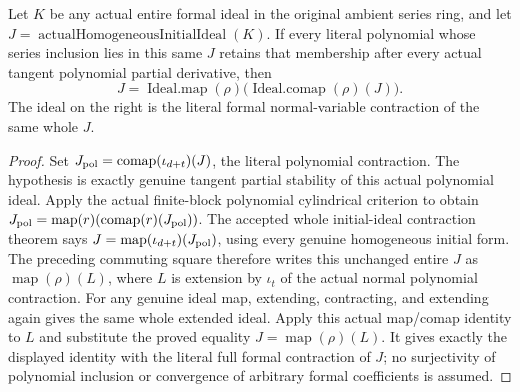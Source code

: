 \begin{theorem}
\label{hir:actual-whole-initial-normal-extension-of-polynomial-tangent-stability}
\leanok
Let $K$ be any actual entire formal ideal in the original ambient
series ring, and let $J=\operatorname{actualHomogeneousInitialIdeal}(K)$.
If every literal polynomial whose series inclusion lies in this same
$J$ retains that membership after every actual tangent polynomial
partial derivative, then
\[
 J=\operatorname{Ideal.map}(\rho)
       \bigl(\operatorname{Ideal.comap}(\rho)(J)\bigr).
\]
The ideal on the right is the literal formal normal-variable
contraction of the same whole $J$.
\end{theorem}
\begin{proof}
Set $J_{\rm pol}=\operatorname{comap}(\iota_{d+t})(J)$, the literal
polynomial contraction. The hypothesis is exactly genuine tangent
partial stability of this actual polynomial ideal. Apply the actual
finite-block polynomial cylindrical criterion to obtain
$J_{\rm pol}=\operatorname{map}(r)(\operatorname{comap}(r)(J_{\rm pol}))$.
The accepted whole initial-ideal contraction theorem says
$J=\operatorname{map}(\iota_{d+t})(J_{\rm pol})$, using every genuine
homogeneous initial form. The preceding commuting square therefore
writes this unchanged entire $J$ as $\operatorname{map}(\rho)(L)$,
where $L$ is extension by $\iota_t$ of the actual normal polynomial
contraction. For any genuine ideal map, extending, contracting, and
extending again gives the same whole extended ideal. Apply this
actual map/comap identity to $L$ and substitute the proved equality
$J=\operatorname{map}(\rho)(L)$. It gives exactly the displayed
identity with the literal full formal contraction of $J$; no
surjectivity of polynomial inclusion or convergence of arbitrary
formal coefficients is assumed.
\end{proof}

